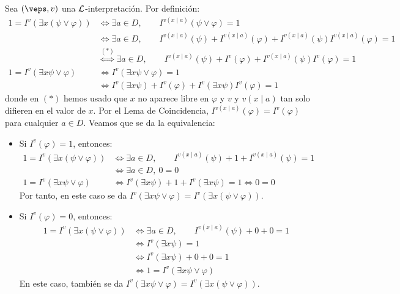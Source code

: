 \begin{ejercicio}
\begin{enumerate}
        Sea $(\veps,v)$ una $\mathcal{L}$-interpretación. Por definición:
        \begin{align*}
            1 = I^v(\exists x(\psi \vee \varphi))
            &\iff \exists a\in D,\qquad I^{v(x\mid a)}(\psi \vee \varphi) = 1\\
            &\iff \exists a\in D,\qquad I^{v(x\mid a)}(\psi) + I^{v(x\mid a)}(\varphi) + I^{v(x\mid a)}(\psi)I^{v(x\mid a)}(\varphi) = 1\\
            &\stackrel{(\ast)}{\iff} \exists a\in D,\qquad I^{v(x\mid a)}(\psi) + I^{v}(\varphi) + I^{v(x\mid a)}(\psi)I^{v}(\varphi) = 1\\
            1 = I^v(\exists x \psi \vee \varphi)
            &\iff I^v(\exists x \psi \vee \varphi) = 1\\
            &\iff I^v(\exists x \psi) + I^v(\varphi) + I^v(\exists x \psi)I^v(\varphi) = 1
        \end{align*}
        donde en $(\ast)$ hemos usado que $x$ no aparece libre en $\varphi$ y $v$ y $v(x\mid a)$ tan solo difieren en el valor de $x$. Por el Lema de Coincidencia, $I^{v(x\mid a)}(\varphi) = I^v(\varphi)$ para cualquier $a\in D$.
        Veamos que se da la equivalencia:
        \begin{itemize}
            \item Si $I^v(\varphi)=1$, entonces:
            \begin{align*}
                1 = I^v(\exists x(\psi \vee \varphi)) &\iff \exists a\in D,\qquad I^{v(x\mid a)}(\psi) + 1 + I^{v(x\mid a)}(\psi) = 1\\
                &\iff \exists a\in D, \ 0=0\\
                1 = I^v(\exists x \psi \vee \varphi)
                &\iff I^v(\exists x \psi) + 1 + I^v(\exists x \psi) = 1 \iff 0=0
            \end{align*}
            Por tanto, en este caso se da $I^v(\exists x \psi \vee \varphi) = I^v(\exists x(\psi \vee \varphi))$.\\

            \item Si $I^v(\varphi)=0$, entonces:
            \begin{align*}
                1 = I^v(\exists x(\psi \vee \varphi)) &\iff \exists a\in D,\qquad I^{v(x\mid a)}(\psi) + 0 + 0= 1\\
                &\iff I^v(\exists x \psi) = 1\\
                &\iff I^v(\exists x \psi) + 0 + 0 = 1\\
                &\iff 1 = I^v(\exists x \psi \vee \varphi)
            \end{align*}
            En este caso, también se da $I^v(\exists x \psi \vee \varphi) = I^v(\exists x(\psi \vee \varphi))$.
        \end{itemize}
        

\end{enumerate}
\end{ejercicio}
